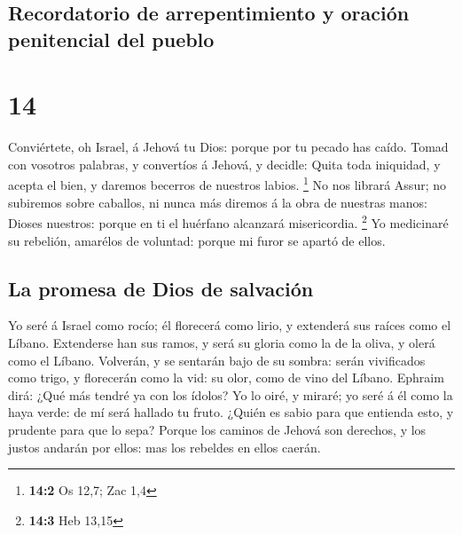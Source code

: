 \hypertarget{recordatorio-de-arrepentimiento-y-oraciuxf3n-penitencial-del-pueblo}{%
\subsection{Recordatorio de arrepentimiento y oración penitencial del
pueblo}\label{recordatorio-de-arrepentimiento-y-oraciuxf3n-penitencial-del-pueblo}}

\hypertarget{section-13}{%
\section{14}\label{section-13}}

 Conviértete, oh Israel, á Jehová tu Dios: porque por tu
pecado has caído.  Tomad con vosotros palabras, y convertíos
á Jehová, y decidle: Quita toda iniquidad, y acepta el bien, y daremos
becerros de nuestros labios. \footnote{\textbf{14:2} Os 12,7; Zac 1,4}
 No nos librará Assur; no subiremos sobre caballos, ni nunca
más diremos á la obra de nuestras manos: Dioses nuestros: porque en ti
el huérfano alcanzará misericordia. \footnote{\textbf{14:3} Heb 13,15}
 Yo medicinaré su rebelión, amarélos de voluntad: porque mi
furor se apartó de ellos.

\hypertarget{la-promesa-de-dios-de-salvaciuxf3n}{%
\subsection{La promesa de Dios de
salvación}\label{la-promesa-de-dios-de-salvaciuxf3n}}

 Yo seré á Israel como rocío; él florecerá como lirio, y
extenderá sus raíces como el Líbano.  Extenderse han sus
ramos, y será su gloria como la de la oliva, y olerá como el Líbano.
 Volverán, y se sentarán bajo de su sombra: serán
vivificados como trigo, y florecerán como la vid: su olor, como de vino
del Líbano.  Ephraim dirá: ¿Qué más tendré ya con los
ídolos? Yo lo oiré, y miraré; yo seré á él como la haya verde: de mí
será hallado tu fruto.  ¿Quién es sabio para que entienda
esto, y prudente para que lo sepa? Porque los caminos de Jehová son
derechos, y los justos andarán por ellos: mas los rebeldes en ellos
caerán.
